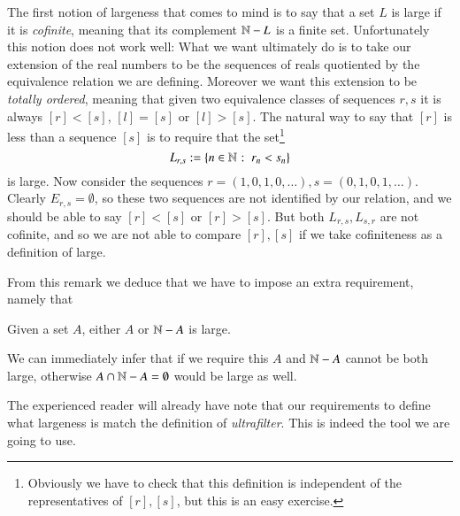 \documentclass[adraft, copyright,creativecommons,sharealike,noncommercial]{Preambles/eptcs}
\begin{document}
\begin{remark}
	The first notion of largeness that comes to mind is to say that a set $L$ is large if it is \emph{cofinite}, meaning that its complement $\mathbb{N} - L$ is a finite set. Unfortunately this notion does not work well: What we want ultimately do is to take our extension of the real numbers to be the sequences of reals quotiented by the equivalence relation we are defining. Moreover we want this extension to be \emph{totally ordered}, meaning that given two equivalence classes of sequences $r,s$ it is always $[r] < [s]$, $[l] = [s]$ or $[l] > [s]$. The natural way to say that $[r]$ is less than a sequence $[s]$ is to require that the set\footnote{Obviously we have to check that this definition is independent of the representatives of $[r], [s]$, but this is an easy exercise.}
	\begin{equation*}
		L_{r,s} : = \left\{n \in \mathbb{N} \: \colon \: r_n < s_n\right\}
	\end{equation*}
	is large. Now consider the sequences $r = (1,0,1,0, \dots), s=(0,1,0,1,\dots)$. Clearly $E_{r,s} = \emptyset$, so these two sequences are not identified by our relation, and we should be able to say $[r] < [s]$ or $[r] > [s]$. But both $L_{r,s}, L_{s,r}$ are not cofinite, and so we are not able to compare $[r],[s]$ if we take cofiniteness as a definition of large. 
\end{remark}
	From this remark we deduce that we have to impose an extra requirement, namely that
	\begin{center}
		Given a set $A$, either $A$ or $\mathbb{N} - A$ is large.
	\end{center}
	We can immediately infer that if we require this $A$ and $\mathbb{N} - A$ cannot be both large, otherwise $A \cap \mathbb{N} - A = \emptyset$ would be large as well.
	
	The experienced reader will already have note that our requirements to define what largeness is match the definition of \emph{ultrafilter}. This is indeed the tool we are going to use.
	
\end{document}

